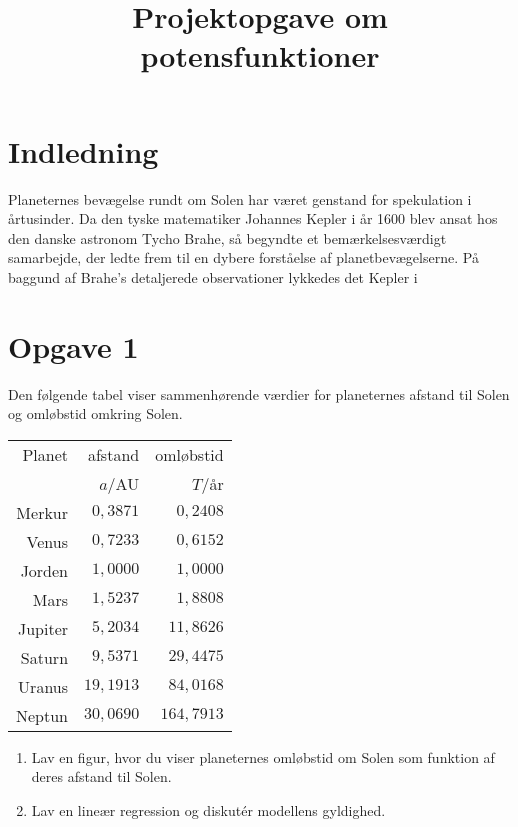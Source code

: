 \documentclass[12pt,oneside,a4paper]{article}
\title{Projektopgave om potensfunktioner}
\date{\vspace{-5ex}}
\theoremstyle{plain}
\begin{document}
\maketitle

\section*{Indledning}
Planeternes bevægelse rundt om Solen har været genstand for spekulation i årtusinder.
Da den tyske matematiker Johannes Kepler i år 1600 blev ansat hos den danske
astronom Tycho Brahe, så begyndte et bemærkelsesværdigt samarbejde, der ledte frem til
en dybere forståelse af planetbevægelserne. På baggund af Brahe's detaljerede observationer
lykkedes det Kepler i 

\section*{Opgave 1}
Den følgende tabel viser sammenhørende værdier for planeternes afstand til Solen og
omløbstid omkring Solen.

\vspace{2ex}

\begin{center}
\begin{tabular}{r|r|r}
    \hline
    Planet  & afstand   & omløbstid \\
            & $a$/AU    & $T$/år   \\
    \hline 
    Merkur  &  $0,3871$ &   $0,2408$ \\
    Venus   &  $0,7233$ &   $0,6152$ \\
    Jorden  &  $1,0000$ &   $1,0000$ \\
    Mars    &  $1,5237$ &   $1,8808$ \\
    Jupiter &  $5,2034$ &  $11,8626$ \\
    Saturn  &  $9,5371$ &  $29,4475$ \\
    Uranus  & $19,1913$ &  $84,0168$ \\
    Neptun  & $30,0690$ & $164,7913$ \\
    \hline 
\end{tabular}
\end{center}

\begin{enumerate}[label=\alph*.]
    \item Lav en figur, hvor du viser planeternes omløbstid om Solen som
        funktion af deres afstand til Solen.
    \item Lav en lineær regression og diskutér modellens gyldighed.
\end{enumerate}
\end{document}
